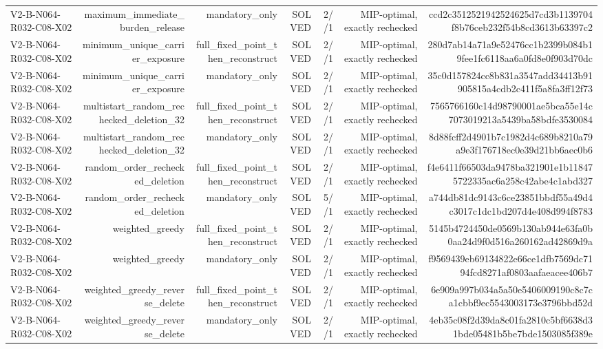 {\begin{longtable}{lrrrrrr}
V2-B-N064-R032-C08-X02 & maximum\_immediate\_burden\_release & mandatory\_only & SOLVED & 2//1 & MIP-optimal, exactly rechecked & ccd2c3512521942524625d7cd3b1139704f8b76ceb232f54b8cd3613b63397c2 \\
V2-B-N064-R032-C08-X02 & minimum\_unique\_carrier\_exposure & full\_fixed\_point\_then\_reconstruct & SOLVED & 2//1 & MIP-optimal, exactly rechecked & 280d7ab14a71a9e52476cc1b2399b084b19fee1fc6118aa6a0fd8e0f903d70dc \\
V2-B-N064-R032-C08-X02 & minimum\_unique\_carrier\_exposure & mandatory\_only & SOLVED & 2//1 & MIP-optimal, exactly rechecked & 35c0d157824cc8b831a3547add34413b91905815a4cdb2c411f5a8fa3ff12f73 \\
V2-B-N064-R032-C08-X02 & multistart\_random\_rechecked\_deletion\_32 & full\_fixed\_point\_then\_reconstruct & SOLVED & 2//1 & MIP-optimal, exactly rechecked & 7565766160c14d98790001ae5bca55e14c7073019213a5439ba58bdfe3530084 \\
V2-B-N064-R032-C08-X02 & multistart\_random\_rechecked\_deletion\_32 & mandatory\_only & SOLVED & 2//1 & MIP-optimal, exactly rechecked & 8d88fcff2d4901b7c1982d4c689b8210a79a9e3f176718ec0e39d21bb6aec0b6 \\
V2-B-N064-R032-C08-X02 & random\_order\_rechecked\_deletion & full\_fixed\_point\_then\_reconstruct & SOLVED & 2//1 & MIP-optimal, exactly rechecked & f4e6411f66503da9478ba321901e1b118475722335ac6a258c42abe4c1abd327 \\
V2-B-N064-R032-C08-X02 & random\_order\_rechecked\_deletion & mandatory\_only & SOLVED & 5//1 & MIP-optimal, exactly rechecked & a744db81dc9143c6ce23851bbdf55a49d4c3017c1dc1bd207d4e408d994f8783 \\
V2-B-N064-R032-C08-X02 & weighted\_greedy & full\_fixed\_point\_then\_reconstruct & SOLVED & 2//1 & MIP-optimal, exactly rechecked & 5145b4724450de0569b130ab944e63fa0b0aa24d9f0d516a260162ad42869d9a \\
V2-B-N064-R032-C08-X02 & weighted\_greedy & mandatory\_only & SOLVED & 2//1 & MIP-optimal, exactly rechecked & f9569439eb69134822e66ce1dfb7569dc7194fcd8271af0803aafaeacee406b7 \\
V2-B-N064-R032-C08-X02 & weighted\_greedy\_reverse\_delete & full\_fixed\_point\_then\_reconstruct & SOLVED & 2//1 & MIP-optimal, exactly rechecked & 6e909a997b034a5a50e5406009190c8c7ca1cbbf9ec5543003173e3796bbd52d \\
V2-B-N064-R032-C08-X02 & weighted\_greedy\_reverse\_delete & mandatory\_only & SOLVED & 2//1 & MIP-optimal, exactly rechecked & 4eb35c08f2d39da8c01fa2810c5bf6638d31bde05481b5be7bde1503085f389e \\

\end{longtable}}
